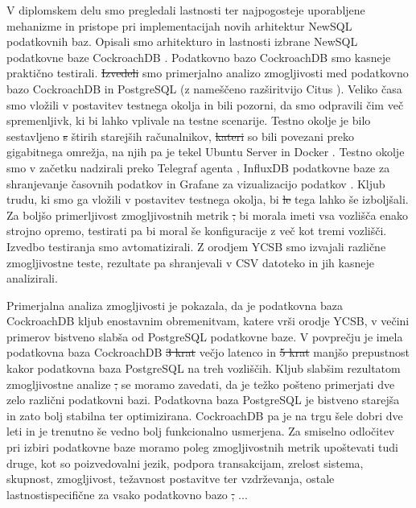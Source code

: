 \documentclass[a4paper, 12pt]{book}
\providecommand{\DIFaddtex}[1]{{\protect\color{blue}\uwave{#1}}} %
\providecommand{\DIFdeltex}[1]{{\protect\color{red}\sout{#1}}}                      %
\providecommand{\DIFaddbegin}{} %
\providecommand{\DIFaddend}{} %
\providecommand{\DIFdelbegin}{} %
\providecommand{\DIFdelend}{} %
\providecommand{\DIFadd}[1]{\texorpdfstring{\DIFaddtex{#1}}{#1}} %
\providecommand{\DIFdel}[1]{\texorpdfstring{\DIFdeltex{#1}}{}} %
\newcommand{\DIFscaledelfig}{0.5}
\newlength{\DIFdelgraphicswidth} %
\newlength{\DIFdelgraphicsheight} %
\newcommand{\DIFaddincludegraphics}[2][]{{\color{blue}\fbox{\DIFOincludegraphics[#1]{#2}}}} %
\newcommand{\DIFdelincludegraphics}[2][]{%
\sbox{\DIFdelgraphicsbox}{\DIFOincludegraphics[#1]{#2}}%
\settoboxwidth{\DIFdelgraphicswidth}{\DIFdelgraphicsbox} %
\settoboxtotalheight{\DIFdelgraphicsheight}{\DIFdelgraphicsbox} %
\scalebox{\DIFscaledelfig}{%
\parbox[b]{\DIFdelgraphicswidth}{\usebox{\DIFdelgraphicsbox}\\[-\baselineskip] \rule{\DIFdelgraphicswidth}{0em}}\llap{\resizebox{\DIFdelgraphicswidth}{\DIFdelgraphicsheight}{%
\setlength{\unitlength}{\DIFdelgraphicswidth}%
\begin{picture}(1,1)%
\thicklines\linethickness{2pt} %
{\color[rgb]{1,0,0}\put(0,0){\framebox(1,1){}}}%
{\color[rgb]{1,0,0}\put(0,0){\line( 1,1){1}}}%
{\color[rgb]{1,0,0}\put(0,1){\line(1,-1){1}}}%
\end{picture}%
}\hspace*{3pt}}} %
} %
\DeclareRobustCommand{\DIFaddbegin}{\DIFOaddbegin \let\includegraphics\DIFaddincludegraphics} %
\DeclareRobustCommand{\DIFaddend}{\DIFOaddend \let\includegraphics\DIFOincludegraphics} %
\DeclareRobustCommand{\DIFdelbegin}{\DIFOdelbegin \let\includegraphics\DIFdelincludegraphics} %
\DeclareRobustCommand{\DIFdelend}{\DIFOaddend \let\includegraphics\DIFOincludegraphics} %
\begin{document}
V diplomskem delu smo pregledali lastnosti  ter najpogosteje uporabljene mehanizme in pristope pri implementacijah novih arhitektur NewSQL podatkovnih baz. Opisali smo arhitekturo in lastnosti izbrane NewSQL podatkovne baze CockroachDB \cite{CRDB-home}. Podatkovno bazo CockroachDB smo kasneje praktično testirali. \DIFdelbegin \DIFdel{Izvedeli }\DIFdelend \DIFaddbegin \DIFadd{Izvedli }\DIFaddend smo primerjalno analizo zmogljivosti med podatkovno bazo CockroachDB in PostgreSQL \cite{postgres} (z nameščeno razširitvijo Citus \cite{citus}). Veliko časa smo vložili v postavitev testnega okolja in bili pozorni, da smo odpravili čim več spremenljivk, ki bi lahko vplivale na testne scenarije. Testno okolje je bilo sestavljeno \DIFdelbegin \DIFdel{s }\DIFdelend \DIFaddbegin \DIFadd{iz }\DIFaddend štirih starejših računalnikov, \DIFdelbegin \DIFdel{kateri }\DIFdelend \DIFaddbegin \DIFadd{ki }\DIFaddend so bili povezani preko gigabitnega omrežja, na njih pa je tekel Ubuntu Server \cite{ubuntu-server} in Docker \cite{docker}. Testno okolje smo v začetku nadzirali preko Telegraf agenta \cite{telegraf}, InfluxDB podatkovne baze za shranjevanje časovnih podatkov \cite{influxdb} in Grafane za vizualizacijo podatkov \cite{grafana}. Kljub trudu, ki smo ga vložili v postavitev testnega okolja, bi \DIFdelbegin \DIFdel{le }\DIFdelend tega lahko še izboljšali. Za boljšo primerljivost zmogljivostnih metrik \DIFdelbegin \DIFdel{, }\DIFdelend bi morala imeti vsa vozlišča enako strojno opremo, testirati pa bi moral še konfiguracije z več kot tremi vozlišči. Izvedbo testiranja smo avtomatizirali. Z orodjem YCSB \cite{brianfrankcooper/YCSB} smo izvajali različne zmogljivostne teste, rezultate pa shranjevali v CSV datoteko in jih kasneje analizirali.

Primerjalna analiza zmogljivosti je pokazala, da je podatkovna baza Cock\-roachDB kljub enostavnim obremenitvam, katere vrši orodje YCSB, v večini primerov bistveno slabša od PostgreSQL podatkovne baze. V povprečju je imela podatkovna baza Cock\-roachDB \DIFdelbegin \DIFdel{3 krat }\DIFdelend \DIFaddbegin \DIFadd{3-krat }\DIFaddend večjo latenco in \DIFdelbegin \DIFdel{5 krat }\DIFdelend \DIFaddbegin \DIFadd{5-krat }\DIFaddend manjšo prepustnost kakor podatkovna baza PostgreSQL na treh vozliščih.
Kljub slabšim rezultatom zmogljivostne analize \DIFdelbegin \DIFdel{, }\DIFdelend se moramo zavedati, da je težko pošteno primerjati dve zelo različni podatkovni bazi. Podatkovna baza PostgreSQL je bistveno starejša in zato bolj stabilna ter optimizirana. CockroachDB pa je na trgu šele dobri dve leti in je trenutno še vedno bolj funkcionalno usmerjena. Za smiselno odločitev pri izbiri podatkovne baze moramo poleg zmogljivostnih metrik upoštevati tudi druge, kot so poizvedovalni jezik, podpora transakcijam, zrelost sistema, skupnost, zmogljivost, težavnost postavitve ter vzdrževanja, ostale lastnosti\DIFaddbegin \DIFadd{, }\DIFaddend specifične za vsako podatkovno bazo \DIFdelbegin \DIFdel{, }\DIFdelend ...
\end{document}
